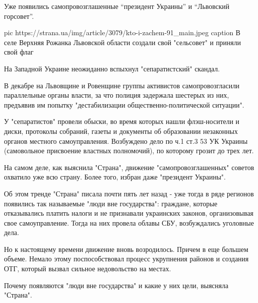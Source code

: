  
 
 
 
 
Уже появились самопровозглашенные \enquote{президент Украины} и \enquote{Львовский горсовет}.

\ifcmt
pic https://strana.ua/img/article/3079/kto-i-zachem-91_main.jpeg
caption В селе Верхняя Рожанка Львовской области создали свой "сельсовет" и приняли свой флаг
\fi

На Западной Украине неожиданно вспыхнул "сепаратистский" скандал. 

В декабре на Львовщине и Ровенщине группы активистов самопровозгласили
параллельные органы власти, за что полиция задержала шестерых из них,
предъявив им попытку "дестабилизации общественно-политической ситуации".

У "сепаратистов" провели обыски, во время которых нашли флэш-носители и
диски, протоколы собраний, газеты и документы об образовании незаконных
органов местного самоуправления. Возбуждено дело по ч.1 ст.3 53 УК Украины
(самовольное присвоение властных полномочий), по которому грозит до трех
лет. 

На самом деле, как выяснила "Страна", движение "самопровозглашенных"
советов охватило уже всю страну. Более того, избран даже "президент
Украины".

Об этом тренде "Страна" писала почти пять лет назад - уже тогда в ряде
регионов появились так называемые "люди вне государства": граждане,
которые отказывались платить налоги и не признавали украинских законов,
организовывая свое самоуправление. Тогда на них провела облавы СБУ,
возбуждались уголовные дела.

Но к настоящему времени движение вновь возродилось. Причем в еще большем
объеме. Немало этому поспособствовал процесс укрупнения районов и создания
ОТГ, который вызвал сильное недовольство на местах.

Почему появляются "люди вне государства" и какие у них цели, выясняла
"Страна". 


